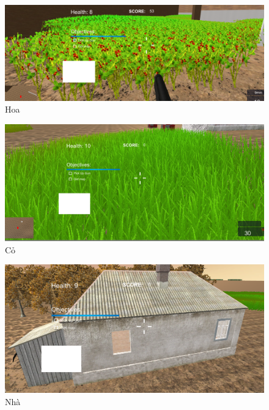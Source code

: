 \documentclass[14pt,a4paper]{extreport}
\begin{document}
\begin{figure}
		\includegraphics[scale=.5]{flower.PNG}
	\caption{Hoa}
\end{figure} 

\begin{figure}
	\includegraphics[scale=.5]{grass.PNG}
	\caption{Cỏ}
\end{figure}
\begin{center}
	\begin{figure}
	\begin{center}
		\includegraphics[scale=.5]{house.PNG}
	\end{center}
	\caption{Nhà}
\end{figure}
\end{center}
\end{document}
